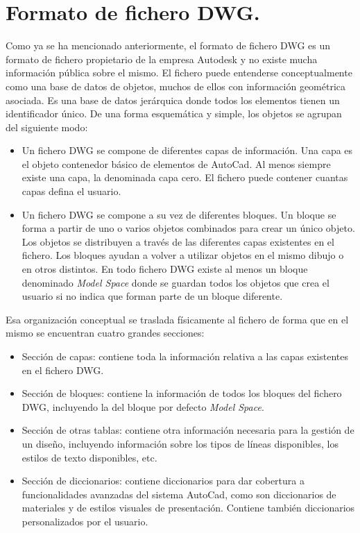 \section{Formato de fichero DWG.}

Como ya se ha mencionado anteriormente, el formato de fichero DWG es un formato de fichero propietario de la empresa Autodesk y no existe mucha información pública sobre el mismo. El fichero puede entenderse conceptualmente como una base de datos de objetos, muchos de ellos con información geométrica asociada. Es una base de datos jerárquica donde todos los elementos tienen un identificador único. De una forma esquemática y simple, los objetos se agrupan del siguiente modo:

\begin{itemize}

\item{Un fichero DWG se compone de diferentes capas de información. Una capa es el objeto contenedor básico de elementos de AutoCad. Al menos siempre existe una capa, la denominada capa cero. El fichero puede contener cuantas capas defina el usuario.}

\item{Un fichero DWG se compone a su vez de diferentes bloques. Un bloque se forma a partir de uno o varios objetos combinados para crear un único objeto. Los objetos se distribuyen a través de las diferentes capas existentes en el fichero. Los bloques ayudan a volver a utilizar objetos en el mismo dibujo o en otros distintos. En todo fichero DWG existe al menos un bloque denominado \textit{Model Space} donde se guardan todos los objetos que crea el usuario si no indica que forman parte de un bloque diferente.}

\end{itemize}

Esa organización conceptual se traslada físicamente al fichero de forma que en el mismo se encuentran cuatro grandes secciones:

\begin{itemize}

\item{Sección de capas: contiene toda la información relativa a las capas existentes en el fichero DWG.}

\item{Sección de bloques: contiene la información de todos los bloques del fichero DWG, incluyendo la del bloque por defecto \textit{Model Space}.}

\item{Sección de otras tablas: contiene otra información necesaria para la gestión de un diseño, incluyendo información sobre los tipos de líneas disponibles, los estilos de texto disponibles, etc.}

\item{Sección de diccionarios: contiene diccionarios para dar cobertura a funcionalidades avanzadas del sistema AutoCad, como son diccionarios de materiales y de estilos visuales de presentación. Contiene también diccionarios personalizados por el usuario.}

\end{itemize}

